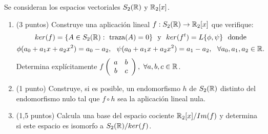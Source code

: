 \documentclass[12pt]{article}
\begin{document}
    \begin{ejercicio}[5,5 puntos]
        Se consideran los espacios vectoriales $S_2(\mathbb{R})$ y $\mathbb{R}_2[x]$.
        \begin{enumerate}
            \item (3 puntos) Construye una aplicación lineal $f:S_2(\mathbb{R}) \rightarrow \mathbb{R}_2[x]$ que verifique:
            \begin{gather*}
                ker(f)=\{A \in S_2(\bb{R}): \text{ traza}(A)=0\} \ \text{ y }\  ker(f^t)=L\{\phi ,\psi \} \ \text{ donde}\\
                \phi (a_0+a_1x+a_2x^2)=a_0-a_2,\ \ \psi(a_0+a_1x+a_2x^2)=a_1-a_2,\ \ \forall a_0, a_1, a_2 \in \bb{R}.
            \end{gather*}
            Determina explícitamente $f\left(\begin{array}{c c}a&b\\b&c\end{array}\right),\ \forall a,b,c \in \mathbb{R}$.
            \item (1 punto) Construye, si es posible, un endomorfismo $h$ de $S_2(\mathbb{R})$ distinto del endomorfismo nulo tal que $f \circ h$ sea la aplicación lineal nula.
            \item (1,5 puntos) Calcula una base del espacio cociente $\mathbb{R}_2[x] / Im(f)$ y determina si este espacio es isomorfo a $S_2(\mathbb{R})/ker(f)$.
        \end{enumerate}
    \end{ejercicio}
        
\end{document}

